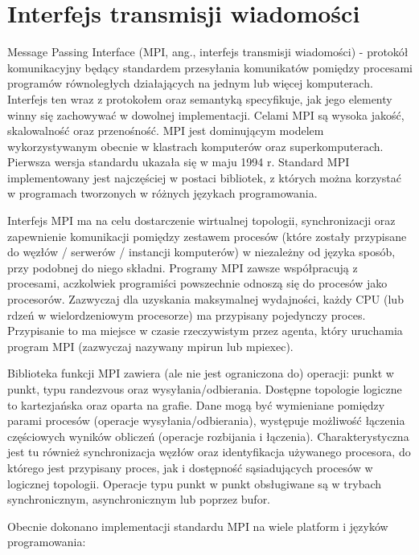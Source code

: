 \documentclass[10pt,a4paper,titlepage,twoside]{report}
\begin{document}
\section{Interfejs transmisji wiadomości}

\indent \indent Message Passing Interface (MPI, ang., interfejs transmisji wiadomości) \cite{ad26} - protokół komunikacyjny będący standardem przesyłania komunikatów pomiędzy procesami programów równoległych działających na jednym lub więcej komputerach. Interfejs ten wraz z protokołem oraz semantyką specyfikuje, jak jego elementy winny się zachowywać w dowolnej implementacji. Celami MPI są wysoka jakość, skalowalność oraz przenośność. MPI jest dominującym modelem wykorzystywanym obecnie w klastrach komputerów oraz superkomputerach. Pierwsza wersja standardu ukazała się w maju 1994 r. Standard MPI implementowany jest najczęściej w postaci bibliotek, z których można korzystać w programach tworzonych w różnych językach programowania.

Interfejs MPI ma na celu dostarczenie wirtualnej topologii, synchronizacji oraz zapewnienie komunikacji pomiędzy zestawem procesów (które zostały przypisane do węzłów / serwerów / instancji komputerów) w niezależny od języka sposób, przy podobnej do niego składni. Programy MPI zawsze współpracują z procesami, aczkolwiek programiści powszechnie odnoszą się do procesów jako procesorów. Zazwyczaj dla uzyskania maksymalnej wydajności, każdy CPU (lub rdzeń w wielordzeniowym procesorze) ma przypisany pojedynczy proces. Przypisanie to ma miejsce w czasie rzeczywistym przez agenta, który uruchamia program MPI (zazwyczaj nazywany mpirun lub mpiexec).

Biblioteka funkcji MPI zawiera (ale nie jest ograniczona do) operacji: punkt w punkt, typu randezvous oraz wysyłania/odbierania. Dostępne topologie logiczne to kartezjańska oraz oparta na grafie. Dane mogą być wymieniane pomiędzy parami procesów (operacje wysyłania/odbierania), występuje możliwość łączenia częściowych wyników obliczeń (operacje rozbijania i łączenia). Charakterystyczna jest tu również synchronizacja węzłów oraz identyfikacja używanego procesora, do którego jest przypisany proces, jak i dostępność sąsiadujących procesów w logicznej topologii. Operacje typu punkt w punkt obsługiwane są w trybach synchronicznym, asynchronicznym lub poprzez bufor.

Obecnie dokonano implementacji standardu MPI na wiele platform i języków programowania:
\end{document}
